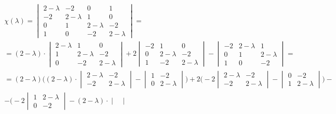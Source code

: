 \begin{multline*}
    \chi(\lambda) =
    \begin{vmatrix}
        2 - \lambda & -2 & 0 & 1 \\
        -2 & 2 - \lambda & 1 & 0 \\
        0 & 1 & 2 - \lambda & -2 \\
        1 & 0 & -2 & 2 - \lambda
    \end{vmatrix} = \\
    = (2 - \lambda) \cdot
    \begin{vmatrix}
    	2 - \lambda & 1 & 0 \\
        1 & 2 - \lambda & -2 \\
        0 & -2 & 2 - \lambda
    \end{vmatrix} + 2
    \begin{vmatrix}
    	-2 & 1 & 0 \\
        0 & 2 - \lambda & -2 \\
        1 & -2 & 2 - \lambda
    \end{vmatrix} -
    \begin{vmatrix}
    	-2 & 2 - \lambda & 1 \\
        0 & 1 & 2 - \lambda \\
        1 & 0 & -2
    \end{vmatrix} = \\
    = (2 - \lambda) \bigg((2 - \lambda) \cdot
    \begin{vmatrix}
    	2 - \lambda & -2 \\
        -2 & 2 - \lambda
    \end{vmatrix} -
    \begin{vmatrix}
    	1 & -2 \\
        0 & 2 - \lambda
    \end{vmatrix} \bigg) + 2 \bigg( -2
    \begin{vmatrix}
    	2 - \lambda & -2 \\
        -2 & 2 - \lambda
    \end{vmatrix} -
    \begin{vmatrix}
    	0 & -2 \\
        1 & 2 - \lambda
    \end{vmatrix} \bigg) - \\
    - \bigg( -2
    \begin{vmatrix}
    	1 & 2 - \lambda \\
        0 & -2
    \end{vmatrix} - (2 - \lambda) \cdot
    \begin{vmatrix}

\end{vmatrix}
\end{multline*}
